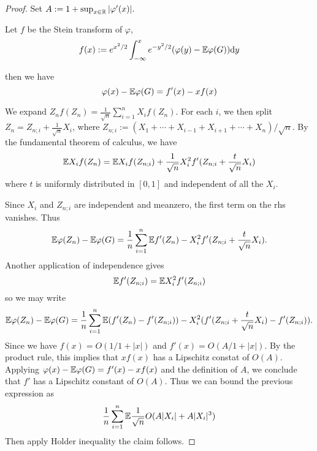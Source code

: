 \begin{proof}
    Set $A:= 1+\sup_{x\in \mathbb{R}}|\varphi'(x)|.$

    Let $f$ be the Stein transform of $\varphi$, 
    \begin{equation*}
        f(x) := e^{x^2/2} \int^x_{-\infty}e^{-y^2/2}(\varphi(y)-\mathbb{E} \varphi(G))\mathrm{d} y
    \end{equation*}

    then we have 
    \begin{equation*}
        \varphi(x)-\mathbb{E} \varphi(G) = f'(x)-xf(x)
    \end{equation*}

    We expand $Z_nf(Z_n)=\frac{1}{\sqrt{n}}\sum_{i=1}^nX_i f(Z_n)$. For each $i$, we then split $Z_n= Z_{n;i}+\frac{1}{\sqrt{n}}X_i$, where $Z_{n;i}:= (X_1+\cdots+X_{i-1}+X_{i+1}+\cdots+X_n)/\sqrt{n}.$
    By the fundamental theorem of calculus, we have 
    \begin{equation*}
        \mathbb{E} X_i f(Z_n) =\mathbb{E} X_i f(Z_{n;i})+\frac{1}{\sqrt{n}} X_i^2 f' (Z_{n;i}+\frac{t}{\sqrt{n}}X_i)
    \end{equation*}
    where $t$ is uniformly distributed in $[0,1]$ and independent of all the $X_i$.

    Since $X_i$ and $Z_{n;i}$ are independent and meanzero, the first term on the rhs vanishes. Thus 
    \begin{equation}
        \mathbb{E} \varphi(Z_n)-\mathbb{E} \varphi(G) =\frac{1}{n}\sum_{i=1}^n \mathbb{E} f'(Z_n) - X_i^2 f'(Z_{n;i}+\frac{t}{\sqrt{n}}X_i).
    \end{equation}
    Another application of independence gives 
    \begin{equation*}
        \mathbb{E} f'(Z_{n;i})=\mathbb{E} X_i^2f'(Z_{n;i})
    \end{equation*}
    so we may write
    \begin{equation*}
        \mathbb{E} \varphi(Z_n)-\mathbb{E} \varphi(G)  = \frac{1}{n} \sum_{i=1}^n \mathbb{E} (f'(Z_n)-f'(Z_{n;i})) - X_i^2(f'(Z_{n;i}+\frac{t}{\sqrt{n}}X_i)-f'(Z_{n;i})).
    \end{equation*}
    Since we have $f(x) = O(1/1+|x|)$ and $f'(x)=O(A/1+|x|)$. By the product rule, this implies that $xf(x)$ has a Lipschitz constat of $O(A)$. 
    Applying $\varphi(x)-\mathbb{E} \varphi(G) = f'(x)-xf(x)$ and the definition of $A$, we conclude that $f'$ has a Lipschitz constant of $O(A)$. Thus we can bound the previous expression as 
    \begin{equation*}
        \frac{1}{n}\sum_{i=1}^n \mathbb{E} \frac{1}{\sqrt{n}}O(A|X_i|+A|X_i|^3)
    \end{equation*}
    Then apply Holder inequality the claim follows.
\end{proof}

